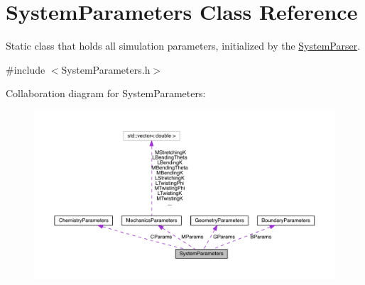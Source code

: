 \hypertarget{classSystemParameters}{\section{System\+Parameters Class Reference}
\label{classSystemParameters}
}


Static class that holds all simulation parameters, initialized by the \hyperlink{classSystemParser}{System\+Parser}.  




{\ttfamily \#include $<$System\+Parameters.\+h$>$}



Collaboration diagram for System\+Parameters\+:
\nopagebreak
\begin{figure}[H]
\begin{center}
\leavevmode
\includegraphics[width=350pt]{classSystemParameters__coll__graph}
\end{center}
\end{figure}
